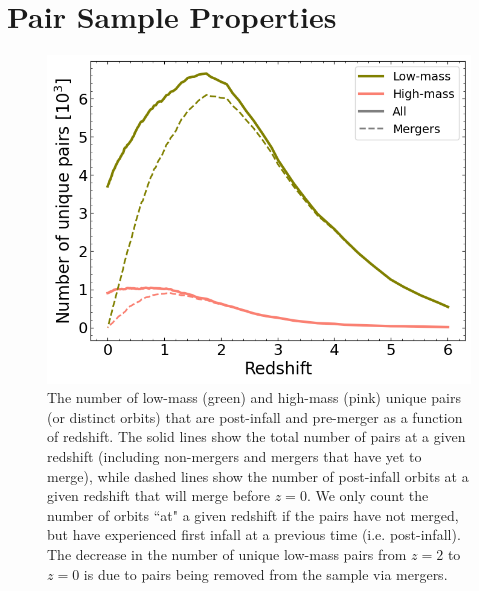 \documentclass[twocolumn,linenumbers]{aastex631}
\begin{document}
\section{Pair Sample Properties}\label{sec:pairprops}
\begin{figure}[htb]
    \begin{center}
    \includegraphics[width=\columnwidth]{plots/bet-on-it/6_paircount.png}
    \caption{The number of low-mass (green) and high-mass (pink) unique pairs (or distinct orbits) that are post-infall and pre-merger as a function of redshift. 
    The solid lines show the total number of pairs at a given redshift (including non-mergers and mergers that have yet to merge), while dashed lines show the number of post-infall orbits at a given redshift that will merge before $z=0$.
    We only count the number of orbits ``at" a given redshift if the pairs have not merged, but have experienced first infall at a previous time (i.e. post-infall). 
    The decrease in the number of unique low-mass pairs from $z=2$ to $z=0$ is due to pairs being removed from the sample via mergers.
    }
    \label{fig:numorbits}
    \end{center}
\end{figure}
\end{document}
